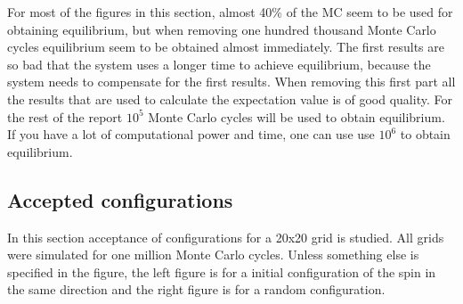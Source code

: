 For most of the figures in this section, almost 40\% of the MC seem to be used for obtaining equilibrium, but when removing one hundred thousand Monte Carlo cycles equilibrium seem to be obtained almost immediately. The first results are so bad that the system uses a longer time to achieve equilibrium, because the system needs to compensate for the first results. When removing this first part all the results that are used to calculate the expectation value is of good quality. For the rest of the report $10^5$ Monte Carlo cycles will be used to obtain equilibrium. If you have a lot of computational power and time, one can use use $10^6$ to obtain equilibrium. 



















\pagebreak
\subsection{Accepted configurations}

In this section acceptance of configurations for a 20x20 grid is studied. All grids were simulated for one million Monte Carlo cycles. Unless something else is specified in the figure, the left figure is for a initial configuration of the spin in the same direction and the right figure is for a random configuration. 

